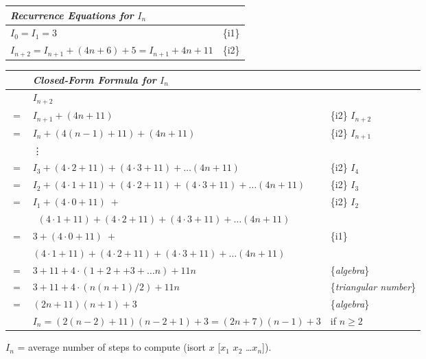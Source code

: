 \begin{figure}
\begin{center}
\begin{spacing}{0.9}
\begin{tabular}{ll}
\emph{Recurrence Equations for} $I_n$ &\\
\hline
$I_0 = I_1 = 3$                                      & \{i1\} \\
$I_{n+2} = I_{n+1} + (4n+6) + 5 = I_{n+1} + 4n + 11$ & \{i2\} \\
\end{tabular}
\end{spacing}
\vspace{2mm}
\begin{spacing}{0.9}
\addtolength{\tabcolsep}{-3pt}
\begin{tabular}{rll}
    & \emph{Closed-Form Formula for} $I_n$ & \\
\hline
    & $I_{n+2}$ & \\
$=$ & $I_{n+1} + (4n+11)$ & \{i2\} $I_{n+2}$\\
$=$ & $I_{n} + (4(n-1)+11) + (4n+11)$ & \{i2\} $I_{n+1}$ \\
    & \vdots & \\
$=$ & $I_{3} + (4\cdot 2 + 11) + (4\cdot 3 + 11) + \dots (4n+11)$                   & \{i2\} $I_{4}$ \\
$=$ & $I_{2} + (4\cdot 1 + 11) + (4\cdot 2 + 11) + (4\cdot 3 + 11) + \dots (4n+11)$ & \{i2\} $I_{3}$ \\
$=$ & $I_{1} + (4\cdot 0 + 11)$~$+$                                                 & \{i2\} $I_{2}$ \\
    & \phantom{$I_{2} + $} ~$(4\cdot 1 + 11) + (4\cdot 2 + 11) + (4\cdot 3 + 11) + \dots (4n+11)$ & \\
$=$ & $3 + (4\cdot 0 + 11)$~$+$                                                     & \{i1\}\\
    & \phantom{$I_{2} + $} $(4\cdot 1 + 11) + (4\cdot 2 + 11) + (4\cdot 3 + 11) + \dots (4n+11)$ & \\
$=$ & $3 + 11 + 4\cdot(1 + 2 + + 3 + \dots n) + 11n$                                & \{\emph{algebra}\} \\
$=$ & $3 + 11 + 4\cdot(n(n+1)/2) + 11n$                                             & \{\emph{triangular number}\} \\
$=$ & $(2n+11)(n+1) + 3$                                                            & \{\emph{algebra}\} \vspace{2mm}\\
    & $I_n = (2(n-2)+11)(n-2+1) + 3 = (2n+7)(n-1)+3$                                & if $n\geq 2$\\
\end{tabular}\addtolength{\tabcolsep}{3pt}
\end{spacing}
\end{center}
\caption{$I_n$ = average number of steps to compute \textsf{(isort $x$ [$x_1$ $x_2$ \dots $x_{n}$])}.}
\label{fig:isort-steps}
\end{figure}

